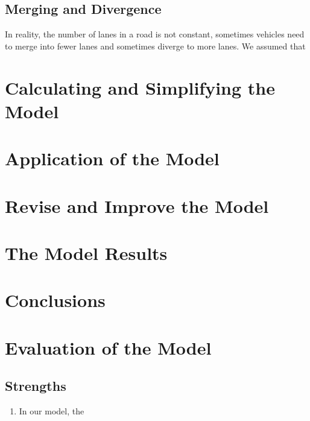 \documentclass{icmmcm}
\begin{document}
\subsection{Merging and Divergence}
In reality, the number of lanes in a road is not constant, sometimes vehicles need to merge into fewer lanes and sometimes diverge to more lanes. We assumed that 
\section{Calculating and Simplifying the Model}
\section{Application of the Model}%
\section{Revise and Improve the Model}
\section{The Model Results}
\subsection{}
\section{Conclusions}
\section{Evaluation of the Model}
\subsection{Strengths}
\begin{enumerate}
\item In our model, the 
\end{enumerate}
\end{document}
